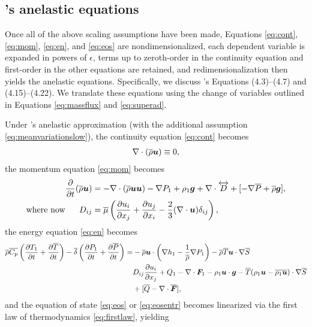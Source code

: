 \documentclass[12pt]{article}
\newcommand{\vecf}{\bm{F}}
\begin{document}
	\subsection{\citet{Gough1969}'s anelastic equations}
	Once all of the above scaling assumptions have been made, Equations \eqref{eq:cont}, \eqref{eq:mom}, \eqref{eq:en}, and \eqref{eq:eos} are nondimensionalized, each dependent variable is expanded in powers of $\epsilon$, terms up to zeroth-order in the continuity equation and first-order in the other equations are retained, and redimensionalization then yields the anelastic equations. Specifically, we discuss \citet{Gough1969}'s Equations (4.3)--(4.7) and (4.15)--(4.22). We translate these equations using the change of variables outlined in Equations \eqref{eq:massflux} and \eqref{eq:superad}. 
	
	Under \citet{Gough1969}'s anelastic approximation (with the additional assumption \eqref{eq:meanvariationslow}), the continuity equation \eqref{eq:cont} becomes
	\begin{align}\label{eq:ancont}
		\nabla\cdot(\overline{\rho}\bm{u})\equiv 0,
	\end{align}
	the momentum equation \eqref{eq:mom} becomes 
	\begin{subequations}\label{eq:anmom}
	\begin{align}
		\frac{\partial}{\partial t}(\overline{\rho}\bm{u})&=-\nabla\cdot(\overline{\rho}\bm{u}\bm{u}) - \nabla P_1 +\rho_1\bm{g} +\nabla\cdot \overleftrightarrow{D}+[-\nabla\overline{P} + \overline{\rho}\bm{g}],\label{eq:anmommain}\\
		\text{where now}\ \ \ \ \  D_{ij}& = \overline{\mu}\left(\frac{\partial u_i}{\partial x_j} + \frac{\partial u_j}{\partial x_i} - \frac{2}{3}(\nabla\cdot\bm{u})\delta_{ij}\right)\label{eq:anmomvisc},
	\end{align}
	\end{subequations}
	the energy equation \eqref{eq:en} becomes 
	\begin{align}\label{eq:anen}
		\rhoover\cpover\left(\pderiv{\tmpone}{t}+\pderiv{\tmpover}{t}\right)- \deltaover\left(\pderiv{\prsone}{t} + \pderiv{\prsover}{t}\right) = &-\rhoover\vecu\cdot\left(\nabla \enthone-\frac{1}{\rhoover}\nabla \prsone\right) - \rhoover \tmpover \ugrad \entrover\nonumber\\
		& D_{ij}\pderiv{u_i}{x_j} + Q _1- \Div\vecf_1 -\rhoone\vecu\cdot\vecg - \tmpover(\rhoone\vecu-\overline{\rhoone\vecu})\cdot\nabla\entrover\nonumber\\
		&+ [\heatover - \Div\overline{\vecf}],
	\end{align}
  and the equation of state \eqref{eq:eos} or \eqref{eq:eosentr} becomes linearized via the first law of thermodynamics \eqref{eq:firstlaw}, yielding
\end{document}
